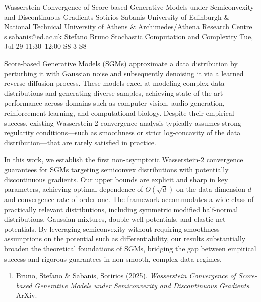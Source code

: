 \begin{talk}
  {Wasserstein Convergence of Score-based Generative Models under Semiconvexity and Discontinuous Gradients}%
  {Sotirios Sabanis}%
  {University of Edinburgh \& National Technical University of Athens \& Archimedes/Athena Research Centre}%
  {s.sabanis@ed.ac.uk}%
  {Stefano Bruno}%
  {Stochastic Computation and Complexity}%
  {Tue, Jul 29 11:30--12:00}%
  {S8-3}%
  {S8}%
    
   
\noindent Score-based Generative Models (SGMs) approximate a data distribution by perturbing it with Gaussian noise and subsequently denoising it via a learned reverse diffusion process. These models excel at modeling complex data distributions and generating diverse samples, achieving state-of-the-art performance across domains such as computer vision, audio generation, reinforcement learning, and computational biology. Despite their empirical success, existing Wasserstein-2 convergence analysis typically assumes strong regularity conditions—such as smoothness or strict log-concavity of the data distribution—that are rarely satisfied in practice.
  
 \noindent In this work, we establish the first non-asymptotic Wasserstein-2 convergence guarantees for SGMs targeting semiconvex distributions with potentially discontinuous gradients. Our upper bounds are explicit and sharp in key parameters, achieving optimal dependence of $O(\sqrt{d})$ on the data dimension $d$ and convergence rate of order one. The framework accommodates a wide class of practically relevant distributions, including symmetric modified half-normal distributions, Gaussian mixtures, double-well potentials, and elastic net potentials. By leveraging semiconvexity without requiring smoothness assumptions on the potential such as differentiability, our results substantially broaden the theoretical foundations of SGMs, bridging the gap between empirical success and rigorous guarantees in non-smooth, complex data regimes.

\medskip


\begin{enumerate}
 \item[{[1]}] Bruno, Stefano \& Sabanis, Sotirios (2025). {\it Wasserstein Convergence of Score-based Generative Models under Semiconvexity and Discontinuous Gradients}. ArXiv.
\end{enumerate}


\end{talk}

